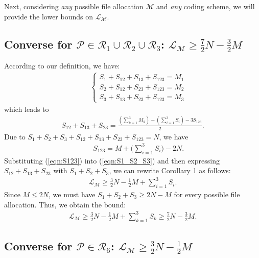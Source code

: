 \documentclass[conference]{IEEEtran}
\begin{document}
Next, considering {\em any} possible file allocation ${\mathcal M}$ and {\em any} coding scheme, we will provide the lower bounds on ${\mathcal L}_{\mathcal M}$.


\subsection{Converse for ${\mathcal P}\in {\mathcal R}_1 \cup {\mathcal R}_2 \cup {\mathcal R}_3$: ${\mathcal L}_{\mathcal M}\geq \frac{7}{2}N-\frac{3}{2}M$}

According to our definition, we have:
\begin{eqnarray}
&&\left\{\begin{array}{l}S_1+S_{12}+S_{13}+S_{123}=M_1\\S_2+S_{12}+S_{23}+S_{123}=M_2\\S_3+S_{13}+S_{23}+S_{123}=M_3\end{array}\right.
\end{eqnarray}
which leads to
\begin{eqnarray}
S_{12}+S_{13}+S_{23}=\frac{(\sum_{k=1}^3{M_k})-(\sum_{i=1}^3{S_i})-3S_{123}}{2}.\label{eqn:S1_S2_S3}
\end{eqnarray}
Due to $S_1+S_2+S_3+S_{12}+S_{13}+S_{23}+S_{123}=N$, we have
\begin{eqnarray}
&&S_{123}=M+\Big(\sum_{i=1}^3{S_i}\Big)-2N.\label{eqn:S123}
\end{eqnarray}
Substituting (\ref{eqn:S123}) into (\ref{eqn:S1_S2_S3}) and then expressing $S_{12}+S_{13}+S_{23}$ with $S_{1}+S_{2}+S_{3}$, we can rewrite Corollary 1 as follows:
\begin{eqnarray}
{\mathcal L}_{\mathcal M}\geq \frac{3}{2}N-\frac{1}{2}M+\sum_{i=1}^3{S_i}.\label{eqn:TM}
\end{eqnarray}
Since $M\leq 2N$, we must have $S_1\!+\!S_2\!+\!S_3\geq 2N\!-\!M$ for every possible file allocation. Thus, we obtain the bound:
\begin{eqnarray}
{\mathcal L}_{\mathcal M}\geq \frac{3}{2}N-\frac{1}{2}M+\sum_{k=1}^3{S_k}\geq \frac{7}{2}N-\frac{3}{2}M.
\end{eqnarray}


\subsection{Converse for ${\mathcal P}\in{\mathcal R}_6$: ${\mathcal L}_{\mathcal M}\geq \frac{3}{2}N-\frac{1}{2}M$}

\end{document}
